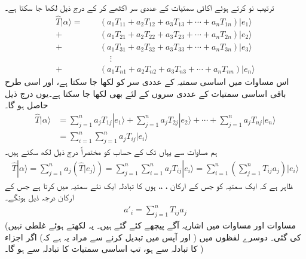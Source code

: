 ترتیب نو  کرتے ہوئے اکائی سمتیات کے عددی سر اکٹھے کر کے درج ذیل لکھا جا سکتا ہے۔
\begin{align*}
\hat{T}|\alpha\rangle=\phantom{+}&(a_1T_{11}+a_2T_{12}+a_3T_{13}+\cdots+a_nT_{1n})|e_1\rangle\\
+&(a_1T_{21}+a_2T_{22}+a_3T_{23}+\cdots+a_nT_{2n})|e_2\rangle\\
+&(a_1T_{31}+a_2T_{32}+a_3T_{33}+\cdots+a_nT_{3n})|e_3\rangle\\
&\phantom{+}\vdots\\
+&(a_1T_{n1}+a_2T_{n2}+a_3T_{n3}+\cdots+a_nT_{nn})|e_n\rangle
\end{align*}
اس مساوات میں  اساسی سمتیہ  کے عددی سر     کو  لکھا جا سکتا ہے، اور اسی طرح باقی اساسی سمتیات کے عددی سروں کے لئے بھی لکھا جا سکتا ہے۔یوں درج ذیل حاصل ہو گا۔
 \begin{align*}
\hat{T}|\alpha\rangle &=\sum_{j=1}^n a_j T_{1j}|e_1\rangle+\sum_{j=1}^n a_j T_{2j}|e_2\rangle+\cdots+\sum_{j=1}^n a_j T_{nj}|e_n\rangle\\
&=\sum_{i=1}^n  \sum_{j=1}^n a_j T_{ij}|e_i\rangle
\end{align*}
ہم مساوات  سے یہاں تک کے حساب کو مختصراً درج ذیل لکھ سکتے ہیں۔
\begin{align}\label{مساوات_ضمیمہ_خطی_تبادلہ_مختصر}
	\hat{T}|\alpha\rangle=\sum_{j=1}^{n}a_j\left(\hat{T}|e_j\rangle\right)=\sum_{j=1}^{n}\sum_{i=1}^{n}a_jT_{ij}|e_i\rangle=\sum_{i=1}^{n}\left(\sum_{j=1}^{n}T_{ij}a_j\right)|e_i\rangle
\end{align}
ظاہر ہے کہ  ایک سمتیہ کو جس کے ارکان ، ،،   ہوں کا تبادلہ  ایک نئے سمتیہ میں کرتا ہے جس کے ارکان درجہ ذیل ہونگے۔ 
\begin{align}\label{مساوات_ضمیمہ_تبادلہ_قائدہ}
	a'_i=\sum_{j=1}^{n}T_{ij}a_j
\end{align}
(مساوات  اور مساوات   میں اشاریہ آگے پیچھے کئے گئے ہیں۔ یہ لکھتے ہوئے غلطی نہیں کی گئی۔ دوسرے لفظوں میں  (   اور   آپس میں تبدیل کرنے  سے مراد یہ ہے کہ) اگر اجزاء کا تبادلہ   سے  ہو، تب اساسی سمتیات کا تبادلہ  سے  ہو گا۔  )

